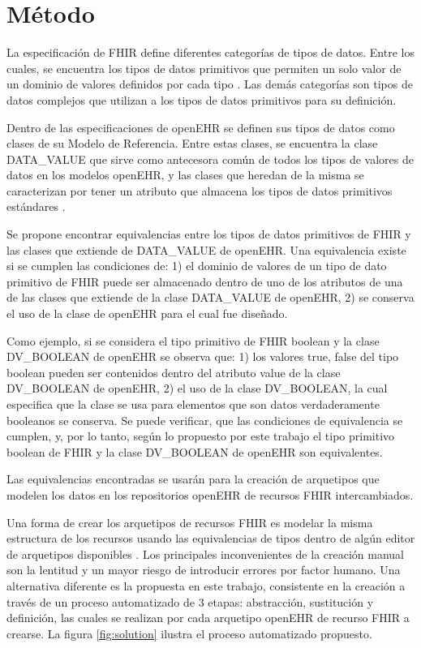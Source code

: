 \section{Método}

La especificación de FHIR define diferentes categorías de tipos de datos. Entre los cuales, se encuentra los tipos de datos primitivos que permiten un solo valor de un dominio de valores definidos por cada tipo \cite{FHIRDataTypes}. Las demás categorías son tipos de datos complejos que utilizan a los tipos de datos primitivos para su definición.

Dentro de las especificaciones de openEHR se definen sus tipos de datos como clases de su Modelo de Referencia. Entre estas clases, se encuentra la clase DATA\_VALUE que sirve como antecesora común de todos los tipos de valores de datos en los modelos openEHR, y las clases que heredan de la misma se caracterizan por tener un atributo que almacena los tipos de datos primitivos estándares \cite{openEHRDataTypes}.

Se propone encontrar equivalencias entre los tipos de datos primitivos de FHIR y las clases que extiende de DATA\_VALUE de openEHR. Una equivalencia existe si se cumplen las condiciones de: 1) el dominio de valores de un tipo de dato primitivo de FHIR puede ser almacenado dentro de uno de los atributos de una de las clases que extiende de la clase DATA\_VALUE de openEHR, 2) se conserva el uso de la clase de openEHR para el cual fue diseñado.

Como ejemplo, si se considera el tipo primitivo de FHIR boolean y la clase DV\_BOOLEAN de openEHR se observa que: 1) los valores true, false del tipo boolean pueden ser contenidos dentro del atributo value de la clase DV\_BOOLEAN de openEHR, 2) el uso de la clase DV\_BOOLEAN, la cual especifica que la clase se usa para elementos que son datos verdaderamente booleanos se conserva. Se puede verificar, que las condiciones de equivalencia se cumplen, y, por lo tanto, según lo propuesto por este trabajo el tipo primitivo boolean de FHIR y la clase DV\_BOOLEAN de openEHR son equivalentes.

Las equivalencias encontradas se usarán para la creación de arquetipos que modelen los datos en los repositorios openEHR de recursos FHIR intercambiados.

Una forma de crear los arquetipos de recursos FHIR es modelar la misma estructura de los recursos usando las equivalencias de tipos dentro de algún editor de arquetipos disponibles \cite{openEHRModellingTools}. Los principales inconvenientes de la creación manual son la lentitud y un mayor riesgo de introducir errores por factor humano. Una alternativa diferente es la propuesta en este trabajo, consistente en la creación a través de un proceso automatizado de 3 etapas: abstracción, sustitución y definición, las cuales se realizan por cada arquetipo openEHR de recurso FHIR a crearse. La figura \ref{fig:solution} ilustra el proceso automatizado propuesto.

